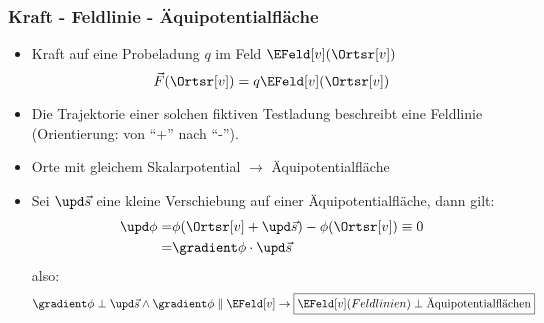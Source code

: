 \begin{frame}
\frametitle{Kraft - Feldlinie - Äquipotentialfläche}

\begin{itemize}[<+->]
\item Kraft auf eine Probeladung $q$ im Feld $\EFeld[v](\Ortsr[v])$
$$
\vec{F}(\Ortsr[v]) = q \EFeld[v](\Ortsr[v])
$$ 
\item Die \alert{Trajektorie} einer solchen fiktiven Testladung
  beschreibt eine \alert{Feldlinie} (Orientierung: von \enquote{+}
  nach \enquote{-}). 
\item Orte mit gleichem Skalarpotential $\to$
  \alert{Äquipotentialfläche}
\item Sei $\upd\vec{s}$ eine kleine Verschiebung auf einer
  Äquipotentialfläche, dann gilt:
\begin{align*}
\upd \phi = & \phi(\Ortsr[v]+\upd\vec{s}) - \phi(\Ortsr[v]) \equiv 0\\
 = & \gradient \phi \cdot \upd\vec{s}
\end{align*}
also:
$$
\gradient \phi \perp \upd\vec{s} \land \gradient \phi \parallel \EFeld[v] \to
\boxed{\EFeld[v] (Feldlinien) \perp \text{Äquipotentialflächen}}  
$$
\end{itemize}

\end{frame}

